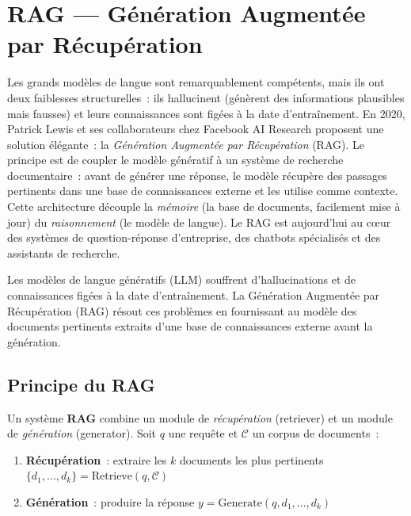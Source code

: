 \chapter{RAG --- G\'en\'eration Augment\'ee par R\'ecup\'eration}
\label{ch:rag}

Les grands mod\`eles de langue sont remarquablement comp\'etents, mais ils ont deux faiblesses structurelles~: ils \og hallucinent \fg{} (g\'en\`erent des informations plausibles mais fausses) et leurs connaissances sont fig\'ees \`a la date d'entra\^inement. En 2020, Patrick Lewis et ses collaborateurs chez Facebook AI Research proposent une solution \'el\'egante~: la \emph{G\'en\'eration Augment\'ee par R\'ecup\'eration} (RAG). Le principe est de coupler le mod\`ele g\'en\'eratif \`a un syst\`eme de recherche documentaire~: avant de g\'en\'erer une r\'eponse, le mod\`ele r\'ecup\`ere des passages pertinents dans une base de connaissances externe et les utilise comme contexte. Cette architecture d\'ecouple la \emph{m\'emoire} (la base de documents, facilement mise \`a jour) du \emph{raisonnement} (le mod\`ele de langue). Le RAG est aujourd'hui au c\oe ur des syst\`emes de question-r\'eponse d'entreprise, des chatbots sp\'ecialis\'es et des assistants de recherche.

\begin{intuition}[title=\textbf{Pourquoi augmenter par la r\'ecup\'eration~?}]
Les mod\`eles de langue g\'en\'eratifs (LLM) souffrent d'hallucinations et
de connaissances fig\'ees \`a la date d'entra\^inement. La G\'en\'eration
Augment\'ee par R\'ecup\'eration (RAG) r\'esout ces probl\`emes en
fournissant au mod\`ele des documents pertinents extraits d'une base de
connaissances externe avant la g\'en\'eration.
\end{intuition}

\section{Principe du RAG}
\label{sec:rag:principe}

\begin{definition}
Un syst\`eme \textbf{RAG} combine un module de \emph{r\'ecup\'eration}
(retriever) et un module de \emph{g\'en\'eration} (generator). Soit $q$
une requ\^ete et $\mathcal{C}$ un corpus de documents~:
\begin{enumerate}
    \item \textbf{R\'ecup\'eration}~: extraire les $k$ documents les plus
    pertinents $\{d_1, \ldots, d_k\} = \text{Retrieve}(q, \mathcal{C})$
    \item \textbf{G\'en\'eration}~: produire la r\'eponse
    $y = \text{Generate}(q, d_1, \ldots, d_k)$
\end{enumerate}
\end{definition}

